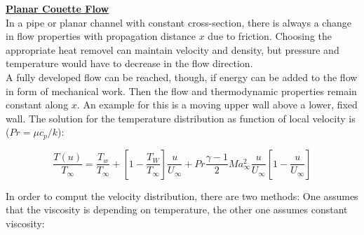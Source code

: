 \documentclass[8pt, landscape, fleqn]{scrartcl}
\begin{document}
\begin{multicols*}{3}
\underline{\textbf{Planar Couette Flow}} \\
In a pipe or planar channel with constant cross-section, there is always a change in flow properties with propagation distance $x$ due to friction. Choosing the appropriate heat removel can maintain velocity and density, but pressure and temperature would have to decrease in the flow direction.\\

A fully developed flow can be reached, though, if energy can be added to the flow in form of mechanical work. Then the flow and thermodynamic properties remain constant along $x$. An example for this is a moving upper wall above a lower, fixed wall. The solution for the temperature distribution as function of local velocity is ($Pr = \mu c_p / k$):

\begin{equation*}
    \frac{T(u)}{T_\infty} = \frac{T_w}{T_\infty}+ \left[1-\frac{T_W}{T_\infty}\right]\frac{u}{U_\infty} + Pr \frac{\gamma-1}{2}Ma^2_\infty \frac{u}{U_\infty}\left[1-\frac{u}{U_\infty}\right]
\end{equation*}

In order to comput the velocity distribution, there are two methods: One assumes that the viscosity is depending on temperature, the other one assumes constant viscosity:


\end{multicols*}
\end{document}
